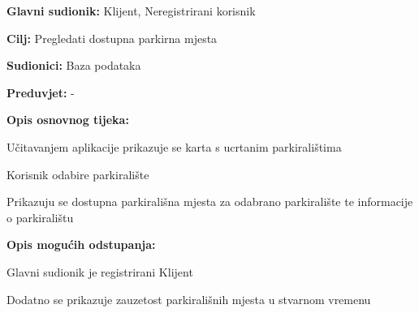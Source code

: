 					\noindent {}
					\begin{packed_item}
	
						\item \textbf{Glavni sudionik: }Klijent, Neregistrirani korisnik
						\item  \textbf{Cilj:} Pregledati dostupna parkirna mjesta
						\item  \textbf{Sudionici:} Baza podataka
						\item  \textbf{Preduvjet:} -
						\item  \textbf{Opis osnovnog tijeka:}
						
						\item[] \begin{packed_enum}
	
							\item Učitavanjem aplikacije prikazuje se karta s ucrtanim parkiralištima
							\item Korisnik odabire parkiralište
							\item Prikazuju se dostupna parkirališna mjesta za odabrano parkiralište te informacije o parkiralištu
							
						\end{packed_enum}

                            \item  \textbf{Opis mogućih odstupanja:}
						
						\item[] \begin{packed_item}
	
							\item[3.a] Glavni sudionik je registrirani Klijent
							\item[] \begin{packed_enum}
								
								\item Dodatno se prikazuje zauzetost parkirališnih mjesta u stvarnom vremenu
								
								
							\end{packed_enum}
	
							
						\end{packed_item}	
					\end{packed_item}

